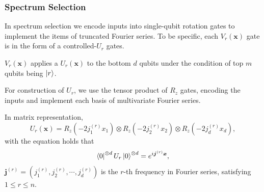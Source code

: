 \documentclass{article}
\theoremstyle{plain}
\theoremstyle{definition}
\theoremstyle{remark}
\begin{document}
\subsubsection{Spectrum Selection}
In spectrum selection we encode inputs into single-qubit rotation gates to implement the items of truncated Fourier series. To be specific, each $V_r(\boldsymbol{x})$ gate is in the form of a controlled-$U_r$ gates. 
 \begin{center}
    \end{center}
$V_r(\boldsymbol{x})$ applies a $U_r(\boldsymbol{x})$ to the bottom $d$ qubits under the condition of top $m$ qubits being $\ket{r}$.

For construction of $U_r$, we use the tensor product of $R_z$ gates, encoding the inputs and implement each basis of multivariate Fourier series.
 \begin{center}
    \end{center}
In matrix representation, 
\begin{equation*}
    U_r(\boldsymbol{x}) = R_z(-2j_1^{(r)}x_1)\otimes R_z(-2j_2^{(r)}x_2)\otimes R_z(-2j_d^{(r)}x_d),
\end{equation*}
with the equation holds that
\begin{equation*}
    \bra{0}^{\otimes d}U_r\ket{0}^{\otimes d} = e^{i\boldsymbol{j}^{(r)}\boldsymbol{x}},
\end{equation*}
$\boldsymbol{j}^{(r)}=(j_1^{(r)},j_2^{(r)},\cdots,j_d^{(r)})$ is the $r$-th frequency in Fourier series, satisfying $1\leq r\leq n$.
    
\end{document}
